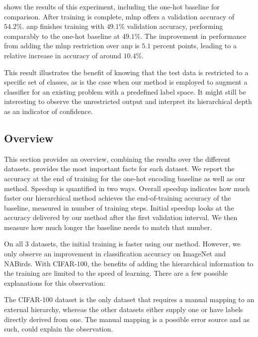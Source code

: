 \documentclass[10pt,twocolumn,letterpaper]{article}
\begin{document}
 shows the results of this experiment, including the one-hot baseline for
comparison. After training is complete, \gls{mlnp} offers a validation accuracy of $54.2\%$.
\Gls{anp} finishes training with $49.1\%$ validation accuracy, performing comparably to the one-hot baseline at $49.1\%$.
The improvement in performance from adding the \gls{mlnp} restriction over \gls{anp} is $5.1$ percent points, leading to a relative increase in
accuracy of around $10.4\%$.

This result illustrates the benefit of knowing that the test data is restricted
to a specific set of classes, as is the case when our method is employed to augment a classifier
for an existing problem with a predefined label space. It might still be interesting
to observe the unrestricted output and interpret its hierarchical depth as an indicator of confidence.

\subsection{Overview}
\label{sec:exp-overview}

This section provides an overview, combining the results over the different datasets.
 provides the most important facts for each dataset. We report
the accuracy at the end of training for the one-hot encoding baseline as well as our
method. Speedup is quantified in two ways. Overall speedup indicates how much faster
our hierarchical method achieves the end-of-training accuracy of the baseline,
measured in number of training steps. Initial speedup looks at the accuracy
delivered by our method after the first validation interval. We then measure
how much longer the baseline needs to match that number.

On all 3 datasets, the initial training is faster using our method. However,
we only observe an improvement in classification accuracy on ImageNet
and NABirds. With CIFAR-100, the benefits of adding the hierarchical information
to the training are limited to the speed of learning. There are a few possible
explanations for this observation:

The CIFAR-100 dataset is the only dataset that requires a manual mapping to
an external hierarchy, whereas the other datasets either supply one or have
labels directly derived from one. The manual mapping is a possible error source
and as such, could explain the observation.
\end{document}
